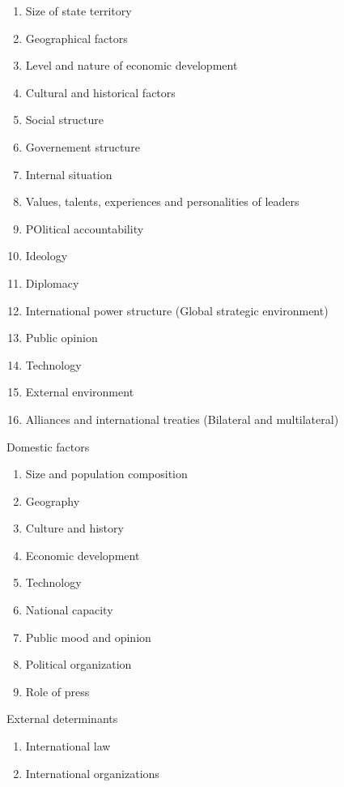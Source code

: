 \documentclass[
  openany]{book}
\providecommand{\tightlist}{%
  \setlength{\itemsep}{0pt}\setlength{\parskip}{0pt}}
\begin{document}
\begin{enumerate}
\def\labelenumi{\arabic{enumi}.}
\tightlist
\item
  Size of state territory
\item
  Geographical factors
\item
  Level and nature of economic development
\item
  Cultural and historical factors
\item
  Social structure
\item
  Governement structure
\item
  Internal situation
\item
  Values, talents, experiences and personalities of leaders
\item
  POlitical accountability
\item
  Ideology
\item
  Diplomacy
\item
  International power structure (Global strategic environment)
\item
  Public opinion
\item
  Technology
\item
  External environment
\item
  Alliances and international treaties (Bilateral and multilateral)
\end{enumerate}

Domestic factors

\begin{enumerate}
\def\labelenumi{\arabic{enumi}.}
\tightlist
\item
  Size and population composition
\item
  Geography
\item
  Culture and history
\item
  Economic development
\item
  Technology
\item
  National capacity
\item
  Public mood and opinion
\item
  Political organization
\item
  Role of press
\end{enumerate}

External determinants

\begin{enumerate}
\def\labelenumi{\arabic{enumi}.}
\tightlist
\item
  International law
\item
  International organizations
\end{enumerate}
\end{document}
